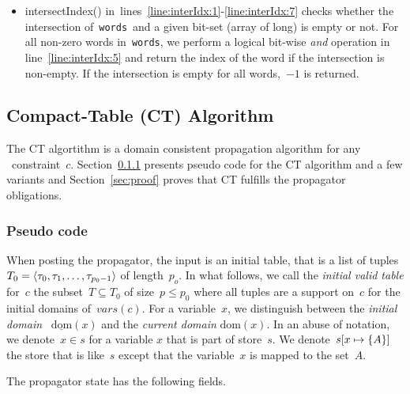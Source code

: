 \documentclass[a4paper,11pt]{article}
\newcommand{\Secref}[1]{Section~\ref{#1}}
\newcommand{\Table}{\Constraint{Table}~}
\newcommand{\linesref}[2]{lines~\ref{#1}-\ref{#2}}
\newcommand{\Dom}[1]{\text{dom}({#1})}
\newcommand{\Dominit}[1]{\underline{\text{dom}}(#1)}
\newcommand{\Words}{\texttt{words}}
\numberwithin{equation}{section}
\begin{document}
\begin{itemize}
  \item intersectIndex() in~\linesref{line:interIdx:1}{line:interIdx:7}
    checks whether the intersection of~\Words~and a given bit-set
    (array of long) is empty or not. For all non-zero words in~\Words,
    we perform a logical bit-wise \emph{and} operation 
    in line~\ref{line:interIdx:5} and return
    the index of the word if the intersection is non-empty. If the
    intersection is empty for all words,~$-1$ is returned.
\end{itemize}

\subsection{Compact-Table (CT) Algorithm}
\label{sec:ct}
The CT algortithm is a domain consistent propagation
algorithm for any \Table constraint~$c$. \Secref{ct:pseudo}
presents pseudo code for the CT algorithm and a few variants
and \Secref{sec:proof} proves that CT fulfills the propagator
obligations.

\subsubsection{Pseudo code}
\label{ct:pseudo}
When posting the propagator, the input is an initial table, that is
a list of tuples $T_0 = \left\langle\tau_0, \tau_1, \ldots, \tau_{p_0-1}\right\rangle$ of
length~$p_o$. In what follows, we call the \emph{initial valid table}
for~$c$ the subset~$T \subseteq T_0$ of size~$p \leq p_0$ where all
tuples are a support on~$c$ for the initial domains of~$vars(c)$.
For a variable~$x$, we distinguish between the \emph{initial domain}
~$\Dominit{x}$ and the \emph{current domain} $\Dom{x}$.
In an abuse of notation, we denote~$x \in s$ for a variable
$x$ that is part of store~$s$. We denote~$s[x \mapsto \left\{A\right\}]$
the store that is like~$s$ except that the variable~$x$ is mapped
to the set~$A$.

The propagator state has the following fields.
\end{document}
